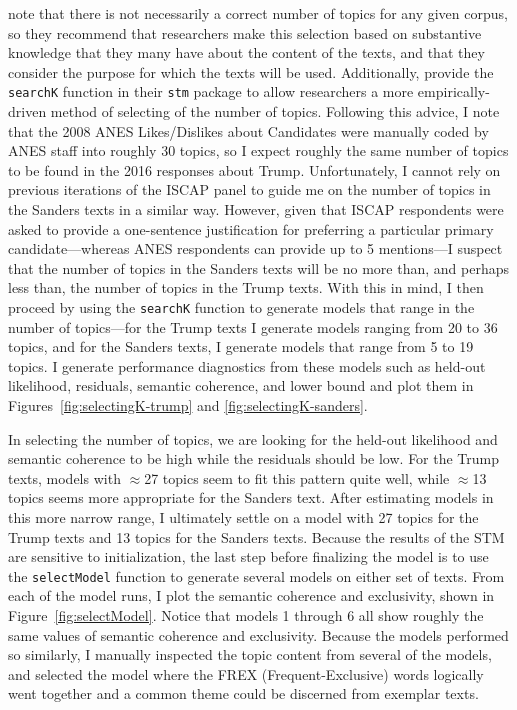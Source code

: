 \documentclass[12pt]{article}
\begin{document}
\begin{appendices}
\begin{refsection}
\textcite{roberts2014structural} note that there is not necessarily a correct number of topics for any given corpus, so they recommend that researchers make this selection based on substantive knowledge that they many have about the content of the texts, and that they consider the purpose for which the texts will be used. Additionally, \textcite{roberts2019stm} provide the \texttt{searchK} function in their \texttt{stm} package to allow researchers a more empirically-driven method of selecting of the number of topics. Following this advice, I note that the 2008 ANES Likes/Dislikes about Candidates were manually coded by ANES staff into roughly 30 topics, so I expect roughly the same number of topics to be found in the 2016 responses about Trump. Unfortunately, I cannot rely on previous iterations of the ISCAP panel to guide me on the number of topics in the Sanders texts in a similar way. However, given that ISCAP respondents were asked to provide a one-sentence justification for preferring a particular primary candidate---whereas ANES respondents can provide up to 5 mentions---I suspect that the number of topics in the Sanders texts will be no more than, and perhaps less than, the number of topics in the Trump texts. With this in mind, I then proceed by using the \texttt{searchK} function to generate models that range in the number of topics---for the Trump texts I generate models ranging from 20 to 36 topics, and for the Sanders texts, I generate models that range from 5 to 19 topics. I generate performance diagnostics from these models such as held-out likelihood, residuals, semantic coherence, and lower bound and plot them in Figures~\ref{fig:selectingK-trump} and \ref{fig:selectingK-sanders}.

In selecting the number of topics, we are looking for the held-out likelihood and semantic coherence to be high while the residuals should be low. For the Trump texts, models with $\approx$27 topics seem to fit this pattern quite well, while $\approx$13 topics seems more appropriate for the Sanders text. After estimating models in this more narrow range, I ultimately settle on a model with 27 topics for the Trump texts and 13 topics for the Sanders texts. Because the results of the STM are sensitive to initialization, the last step before finalizing the model is to use the \texttt{selectModel} function to generate several models on either set of texts. From each of the model runs, I plot the semantic coherence and exclusivity, shown in Figure~\ref{fig:selectModel}. Notice that models 1 through 6 all show roughly the same values of semantic coherence and exclusivity. Because the models performed so similarly, I manually inspected the topic content from several of the models, and selected the model where the FREX (Frequent-Exclusive) words logically went together and a common theme could be discerned from exemplar texts. 




\end{refsection}
\end{appendices}
\end{document}
